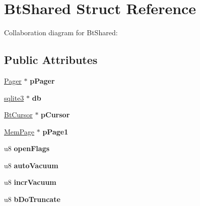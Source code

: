 \hypertarget{structBtShared}{}\section{Bt\+Shared Struct Reference}
\label{structBtShared}


Collaboration diagram for Bt\+Shared\+:
\subsection*{Public Attributes}
\begin{DoxyCompactItemize}
\item 
\hyperlink{structPager}{Pager} $\ast$ {\bfseries p\+Pager}\hypertarget{structBtShared_ab79703fc47a16446274457588d7eb989}{}\label{structBtShared_ab79703fc47a16446274457588d7eb989}

\item 
\hyperlink{structsqlite3}{sqlite3} $\ast$ {\bfseries db}\hypertarget{structBtShared_a93dafa672793f6117a336d5987951c8e}{}\label{structBtShared_a93dafa672793f6117a336d5987951c8e}

\item 
\hyperlink{structBtCursor}{Bt\+Cursor} $\ast$ {\bfseries p\+Cursor}\hypertarget{structBtShared_a8f8b52dee390e5606e8e2a8511530de7}{}\label{structBtShared_a8f8b52dee390e5606e8e2a8511530de7}

\item 
\hyperlink{structMemPage}{Mem\+Page} $\ast$ {\bfseries p\+Page1}\hypertarget{structBtShared_a296dffd1c698ec175fee109718f32d5d}{}\label{structBtShared_a296dffd1c698ec175fee109718f32d5d}

\item 
u8 {\bfseries open\+Flags}\hypertarget{structBtShared_a8fbc250e23d7c417ccfec8cceb08329d}{}\label{structBtShared_a8fbc250e23d7c417ccfec8cceb08329d}

\item 
u8 {\bfseries auto\+Vacuum}\hypertarget{structBtShared_a770c4f6244d4350f27029cb909902a61}{}\label{structBtShared_a770c4f6244d4350f27029cb909902a61}

\item 
u8 {\bfseries incr\+Vacuum}\hypertarget{structBtShared_a8d8ba06335a63d8a36294a0f1ae8377a}{}\label{structBtShared_a8d8ba06335a63d8a36294a0f1ae8377a}

\item 
u8 {\bfseries b\+Do\+Truncate}\hypertarget{structBtShared_a57de6e40475fc532a5de79760521e957}{}\label{structBtShared_a57de6e40475fc532a5de79760521e957}


\end{DoxyCompactItemize}

